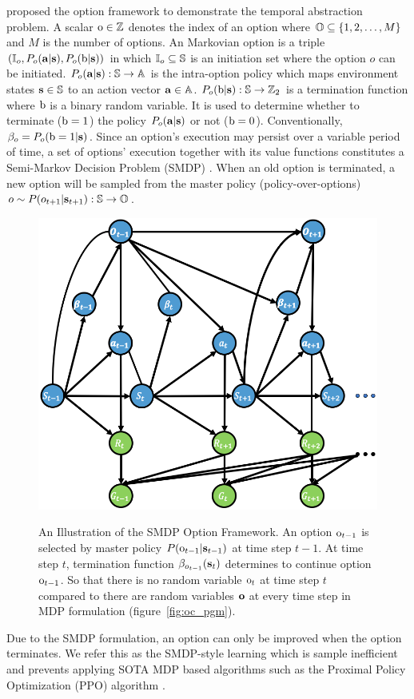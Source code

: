  proposed the option framework to
demonstrate the temporal abstraction problem. A scalar
${\textnormal{o}}\in{\mathbb{Z}}$ denotes the index of an option where ${\mathbb{O}} \subseteq
\{1,2,\ldots,M\}$ and $M$ is the number of options. An Markovian
option is a triple $({\mathbb{I}}_{o},P_{o}({\mathbf{a}}|{\mathbf{s}}),P_{o}({\textnormal{b}}|{\mathbf{s}}))$
in which ${\mathbb{I}}_{o}\subseteq{\mathbb{S}}$ is an initiation set where the
option $o$ can be initiated. $P_{o}({\mathbf{a}}|{\mathbf{s}}):{\mathbb{S}}\rightarrow{\mathbb{A}}$
is the intra-option policy which maps environment states
${\mathbf{s}}\in{\mathbb{S}}$ to an action vector ${\mathbf{a}}\in {\mathbb{A}}$.
$P_{o}({\textnormal{b}}|{\mathbf{s}}):{\mathbb{S}}\rightarrow{\mathbb{Z}}_2$ is a termination function
where ${\textnormal{b}}$ is a binary random variable. It is used to determine
whether to terminate (${\textnormal{b}}=1$) the policy $P_{o}({\mathbf{a}}|{\mathbf{s}})$ or
not (${\textnormal{b}}=0$). Conventionally, $\beta_o=P_o({\textnormal{b}}=1|{\mathbf{s}})$. Since
an option's execution may persist over a variable period of time,
a set of options' execution together with its value functions
constitutes a Semi-Markov Decision Problem (SMDP)
\cite{puterman2014markov}. When an old option is terminated, a
new option will be sampled from the master policy
(policy-over-options) $o\sim P(o_{t+1}|{\mathbf{s}}_{t+1}):
{\mathbb{S}}\rightarrow{\mathbb{O}}$.
\begin{figure}[th!]
  \centering
  \includegraphics[width=0.5\linewidth]{Part1/figures/oc_smdp.png}\\
  \caption{\label{fig:oc_smdp} An Illustration of the SMDP Option
    Framework. An option ${\textnormal{o}}_{t-1}$ is selected by
    master policy $P({\textnormal{o}}_{t-1}|{\mathbf{s}}_{t-1})$ at time step
    $t-1$. At time step $t$, termination function
    $\beta_{o_{t-1}}({\mathbf{s}}_t)$ determines to continue option
    ${\textnormal{o}}_{t-1}$. So that there is no random variable ${\textnormal{o}}_t$ at
    time step $t$ compared to there are random variables ${\mathbf{o}}$
    at every time step in MDP formulation
    (figure~\ref{fig:oc_pgm}).}
\end{figure}
Due to the SMDP formulation, an option can only be improved when
the option terminates. We refer this as the SMDP-style learning
which is sample inefficient and prevents applying SOTA MDP based
algorithms such as the Proximal Policy Optimization (PPO)
algorithm \cite{schulman2017proximal}.



